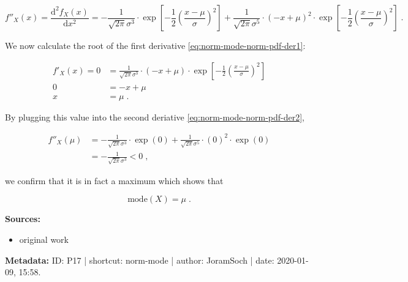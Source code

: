 \documentclass[a4paper,12pt,twoside]{book}
\begin{document}
\begin{equation} \label{eq:norm-mode-norm-pdf-der2}
f''_X(x) = \frac{\mathrm{d}^2f_X(x)}{\mathrm{d}x^2} = -\frac{1}{\sqrt{2 \pi} \sigma^3} \cdot \exp \left[ -\frac{1}{2} \left( \frac{x-\mu}{\sigma} \right)^2 \right] + \frac{1}{\sqrt{2 \pi} \sigma^5} \cdot (-x + \mu)^2 \cdot \exp \left[ -\frac{1}{2} \left( \frac{x-\mu}{\sigma} \right)^2 \right] \; .
\end{equation}

We now calculate the root of the first derivative \eqref{eq:norm-mode-norm-pdf-der1}:

\begin{equation} \label{eq:norm-mode-norm-mode-s1}
\begin{split}
f'_X(x) = 0 &= \frac{1}{\sqrt{2 \pi} \sigma^3} \cdot (-x + \mu) \cdot \exp \left[ -\frac{1}{2} \left( \frac{x-\mu}{\sigma} \right)^2 \right] \\
0 &= -x + \mu \\
x &= \mu \; .
\end{split}
\end{equation}

By plugging this value into the second deriative \eqref{eq:norm-mode-norm-pdf-der2},

\begin{equation} \label{eq:norm-mode-norm-mode-s2}
\begin{split}
f''_X(\mu) &= -\frac{1}{\sqrt{2 \pi} \sigma^3} \cdot \exp(0) + \frac{1}{\sqrt{2 \pi} \sigma^5} \cdot (0)^2 \cdot \exp(0) \\
&= -\frac{1}{\sqrt{2 \pi} \sigma^3} < 0 \; ,
\end{split}
\end{equation}

we confirm that it is in fact a maximum which shows that

\begin{equation} \label{eq:norm-mode-norm-mode-qed}
\mathrm{mode}(X) = \mu \; .
\end{equation}


\vspace{1em}
\textbf{Sources:}
\begin{itemize}
\item original work\end{itemize}


\vspace{1em}
\textbf{Metadata:} ID: P17 | shortcut: norm-mode | author: JoramSoch | date: 2020-01-09, 15:58.
\vspace{1em}
\end{document}
